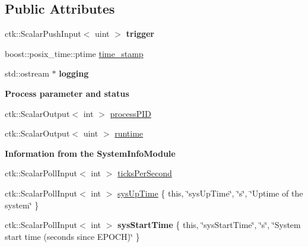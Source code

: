 \subsection*{Public Attributes}
\begin{DoxyCompactItemize}
\item 
ctk\+::\+Scalar\+Push\+Input$<$ uint $>$ {\bfseries trigger}
\item 
boost\+::posix\+\_\+time\+::ptime \hyperlink{structProcessInfoModule_af863af6e454aa703037963ad401cae92}{time\+\_\+stamp}
\item 
std\+::ostream $\ast$ {\bfseries logging}\hypertarget{structProcessInfoModule_a868c52f7b5aa78cd208215b381fc12eb}{}\label{structProcessInfoModule_a868c52f7b5aa78cd208215b381fc12eb}

\end{DoxyCompactItemize}
\begin{Indent}{\bf Process parameter and status}\par
\begin{DoxyCompactItemize}
\item 
ctk\+::\+Scalar\+Output$<$ int $>$ \hyperlink{structProcessInfoModule_aae5355d8100a201888fd835a7515f456}{process\+P\+ID}
\item 
ctk\+::\+Scalar\+Output$<$ uint $>$ \hyperlink{structProcessInfoModule_a8c11129c477f0177e253f3ce414d0fc3}{runtime}
\end{DoxyCompactItemize}
\end{Indent}
\begin{Indent}{\bf Information from the System\+Info\+Module}\par
\begin{DoxyCompactItemize}
\item 
ctk\+::\+Scalar\+Poll\+Input$<$ int $>$ \hyperlink{structProcessInfoModule_adf12150c732bc07aed50684eb8a90fd7}{ticks\+Per\+Second}
\item 
ctk\+::\+Scalar\+Poll\+Input$<$ int $>$ \hyperlink{structProcessInfoModule_af7b86dd5c8d50168f7d64ed21ddd48e7}{sys\+Up\+Time} \{ this, \char`\"{}sys\+Up\+Time\char`\"{}, \char`\"{}s\char`\"{}, \char`\"{}Uptime of the system\char`\"{} \}
\item 
ctk\+::\+Scalar\+Poll\+Input$<$ int $>$ {\bfseries sys\+Start\+Time} \{ this, \char`\"{}sys\+Start\+Time\char`\"{}, \char`\"{}s\char`\"{}, \char`\"{}System start time (seconds since E\+P\+O\+CH)\char`\"{} \}\hypertarget{structProcessInfoModule_a2202806036feab927de3bed80524fd3d}{}\label{structProcessInfoModule_a2202806036feab927de3bed80524fd3d}

\end{DoxyCompactItemize}
\end{Indent}
